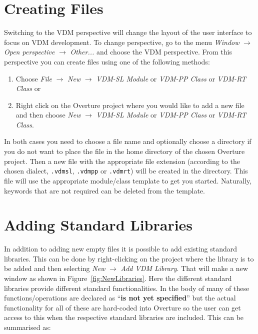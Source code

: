 \documentclass{overturerepchap}
\begin{document}

\section{Creating Files}

Switching to the VDM perspective will change the layout of the user
interface to focus on VDM development. To change perspective, go to the menu
\emph{Window} $\rightarrow$ \emph{Open perspective} $\rightarrow$
\emph{Other...} and choose the VDM perspective.
From this perspective you can create files
using one of the following methods:

\begin{enumerate}
  \item Choose \emph{File} $\rightarrow$ \emph{New} $\rightarrow$
    \emph{VDM-SL Module} or
    \emph{VDM-PP Class} or
    \emph{VDM-RT Class} or
  \item Right click on the Overture project where you would like to
    add a new file and then choose \emph{New} $\rightarrow$
    \emph{VDM-SL Module} or \emph{VDM-PP Class} or \emph{VDM-RT Class}.
\end{enumerate}

In both cases you need to choose a file name and optionally choose a
directory if you do not want to place the file in the home directory of
the chosen Overture project. Then a new file with the appropriate file
extension (according to the chosen dialect, \texttt{.vdmsl},
\texttt{.vdmpp} or \texttt{.vdmrt}) will be
created in the directory. This file will use the appropriate
module/class template to get you started. Naturally, keywords
that are not required can be deleted from the template.

\section{Adding Standard Libraries}

In addition to adding new empty files it is possible to add existing
standard libraries. This can be done by right-clicking on the project
where the library is to be added and then selecting \emph{New} $\rightarrow$
    \emph{Add VDM Library}. That will make a new window as shown in
    Figure~\ref{fig:NewLibraries}. Here the different standard
    libraries provide different standard functionalities. In the body
    of many of these functions/operations are declared as
    ``{\textbf{\ttfamily is not yet specified}}'' but the actual
    functionality for all of these are hard-coded into Overture so the
    user can get access to this when the respective standard libraries
    are included. This can be
    summarised as:
\end{document}
